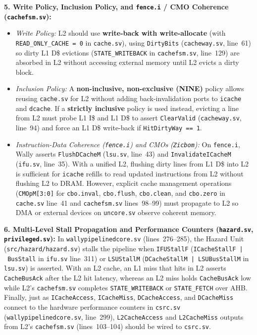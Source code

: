 \documentclass[11pt,a4paper]{article}
\begin{document}
\textbf{5. Write Policy, Inclusion Policy, and \texttt{fence.i} / CMO Coherence (\texttt{cachefsm.sv}):}
\begin{itemize}[leftmargin=1.4em, itemsep=2.5pt, topsep=1.5pt]
    \item \emph{Write Policy:} L2 should use \textbf{write-back with write-allocate} (with \texttt{READ\_ONLY\_CACHE = 0} in \texttt{cache.sv}), using \texttt{DirtyBits} (\texttt{cacheway.sv}, line~61) so dirty L1 D\$ evictions (\texttt{STATE\_\allowbreak WRITEBACK} in \texttt{cachefsm.sv}, line~129) are absorbed in L2 without accessing external memory until L2 evicts a dirty block.
    \item \emph{Inclusion Policy:} A \textbf{non-inclusive, non-exclusive (NINE)} policy allows reusing \texttt{cache.sv} for L2 without adding back-invalidation ports to \texttt{icache} and \texttt{dcache}. If a \textbf{strictly inclusive} policy is used instead, evicting a line from L2 must probe L1 I\$ and L1 D\$ to assert \texttt{ClearValid} (\texttt{cacheway.sv}, line~94) and force an L1 D\$ write-back if \texttt{HitDirtyWay == 1}.
    \item \emph{Instruction-Data Coherence (\texttt{fence.i}) and CMOs (\texttt{Zicbom}):} On \texttt{fence.i}, Wally asserts \texttt{FlushDCacheM} (\texttt{lsu.sv}, line~43) and \texttt{InvalidateICacheM} (\texttt{ifu.sv}, line~35). With a unified L2, flushing dirty lines from L1 D\$ into L2 is sufficient for \texttt{icache} refills to read updated instructions from L2 without flushing L2 to DRAM. However, explicit cache management operations (\texttt{CMOpM[3:0]} for \texttt{cbo.inval}, \texttt{cbo.flush}, \texttt{cbo.clean}, and \texttt{cbo.zero} in \texttt{cache.sv} line~41 and \texttt{cachefsm.sv} lines~98--99) must propagate to L2 so DMA or external devices on \texttt{uncore.sv} observe coherent memory.
\end{itemize}

\textbf{6. Multi-Level Stall Propagation and Performance Counters (\texttt{hazard.sv}, \texttt{privileged.sv}):}
In \texttt{wallypipelinedcore.sv} (lines~276--285), the Hazard Unit (\texttt{src/\allowbreak hazard/\allowbreak hazard.sv}) stalls the pipeline when \texttt{IFUStallF} (\texttt{ICacheStallF\allowbreak\ |\ BusStall} in \texttt{ifu.sv} line~311) or \texttt{LSUStallM} (\texttt{DCacheStallM\allowbreak\ |\ LSUBusStallM} in \texttt{lsu.sv}) is asserted. With an L2 cache, an L1 miss that hits in L2 asserts \texttt{CacheBusAck} after the L2 hit latency, whereas an L2 miss holds \texttt{CacheBusAck} low while L2's \texttt{cachefsm.sv} completes \texttt{STATE\_\allowbreak WRITEBACK} or \texttt{STATE\_FETCH} over AHB. Finally, just as \texttt{ICacheAccess}, \texttt{ICacheMiss}, \texttt{DCacheAccess}, and \texttt{DCacheMiss} connect to the hardware performance counters in \texttt{csrc.sv} (\texttt{wallypipelinedcore.sv}, line~299), \texttt{L2CacheAccess} and \texttt{L2CacheMiss} outputs from L2's \texttt{cachefsm.sv} (lines~103--104) should be wired to \texttt{csrc.sv}.
\end{document}
